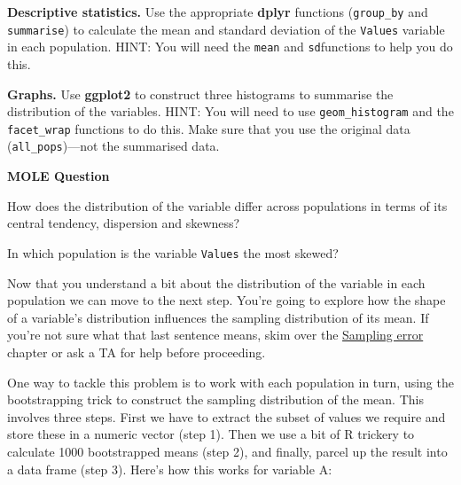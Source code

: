 \documentclass[]{book}
\newenvironment{Shaded}{\begin{snugshade}}{\end{snugshade}}
\newcommand{\KeywordTok}[1]{\textcolor[rgb]{0.13,0.29,0.53}{\textbf{{#1}}}}
\newcommand{\DataTypeTok}[1]{\textcolor[rgb]{0.13,0.29,0.53}{{#1}}}
\newcommand{\DecValTok}[1]{\textcolor[rgb]{0.00,0.00,0.81}{{#1}}}
\newcommand{\StringTok}[1]{\textcolor[rgb]{0.31,0.60,0.02}{{#1}}}
\newcommand{\CommentTok}[1]{\textcolor[rgb]{0.56,0.35,0.01}{\textit{{#1}}}}
\newcommand{\OtherTok}[1]{\textcolor[rgb]{0.56,0.35,0.01}{{#1}}}
\newcommand{\NormalTok}[1]{{#1}}
\begin{document}
\textbf{Descriptive statistics.} Use the appropriate \textbf{dplyr}
functions (\texttt{group\_by} and \texttt{summarise}) to calculate the
mean and standard deviation of the \texttt{Values} variable in each
population. HINT: You will need the \texttt{mean} and
\texttt{sd}functions to help you do this.

\textbf{Graphs.} Use \textbf{ggplot2} to construct three histograms to
summarise the distribution of the variables. HINT: You will need to use
\texttt{geom\_histogram} and the \texttt{facet\_wrap} functions to do
this. Make sure that you use the original data
(\texttt{all\_pops})---not the summarised data.

\begin{do-something}
\textbf{MOLE Question}

How does the distribution of the variable differ across populations in
terms of its central tendency, dispersion and skewness?

In which population is the variable \texttt{Values} the most skewed?
\end{do-something}

Now that you understand a bit about the distribution of the variable in
each population we can move to the next step. You're going to explore
how the shape of a variable's distribution influences the sampling
distribution of its mean. If you're not sure what that last sentence
means, skim over the \protect\hyperlink{sampling-error-1}{Sampling
error} chapter or ask a TA for help before proceeding.

One way to tackle this problem is to work with each population in turn,
using the bootstrapping trick to construct the sampling distribution of
the mean. This involves three steps. First we have to extract the subset
of values we require and store these in a numeric vector (step 1). Then
we use a bit of R trickery to calculate 1000 bootstrapped means (step
2), and finally, parcel up the result into a data frame (step 3). Here's
how this works for variable A:

\begin{Shaded}
\end{Shaded}
\end{document}
